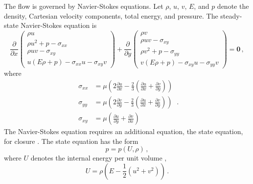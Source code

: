 The flow is governed by Navier-Stokes equations.
Let $\rho$, $u$, $v$, $E$, and $p$ denote the density, Cartesian velocity components, 
total energy, and pressure.
The steady-state Navier-Stokes equation is \cite{aero book}
\begin{equation}
    \frac{\partial}{\partial x} 
    \begin{pmatrix}
        \rho u\\
        \rho u^2 + p - \sigma_{xx}\\
        \rho uv - \sigma_{xy}\\
        u(E\rho+p) - \sigma_{xx} u - \sigma_{xy} v
    \end{pmatrix}
    + \frac{\partial}{\partial y}
    \begin{pmatrix}
        \rho v\\
        \rho uv-\sigma_{xy}\\
        \rho v^2+p-\sigma_{yy}\\
        v(E\rho+p) - \sigma_{xy} u -\sigma_{yy}v
    \end{pmatrix} 
    = \boldsymbol{0}\,,
    \label{NSeqn}
\end{equation}
where
\begin{equation}\begin{split}
    \sigma_{xx} &= \mu \left(2 \frac{\partial u}{\partial x} - \frac{2}{3} \left(\frac{\partial u}{\partial x} 
    + \frac{\partial v}{\partial y}\right)\right)\\
    \sigma_{yy} &= \mu \left(2 \frac{\partial v}{\partial y} - \frac{2}{3} \left(\frac{\partial u}{\partial x} 
    + \frac{\partial v}{\partial y}\right)\right)\\
    \sigma_{xy}&=\mu\left(\frac{\partial u}{\partial y} + \frac{\partial v}{\partial x}\right)
\end{split}\,.\end{equation}
The Navier-Stokes equation requires an additional equation, the state equation, for closure 
\cite{aero book}.
The state equation has the form
\begin{equation}
    p = p(U, \rho)\,,
    \label{state equation}
\end{equation}
where $U$ denotes the internal energy per unit volume \cite{aero book},
\begin{equation}
    U = \rho\left(E-\frac{1}{2}(u^2+v^2)\right)\,.
\end{equation}

